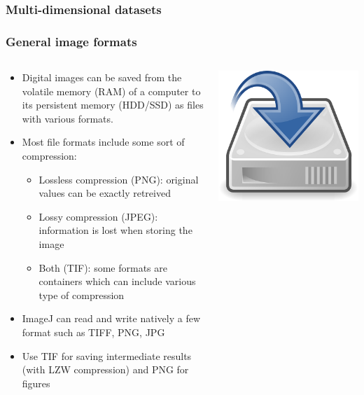 \documentclass[ignorenonframetext,aspectratio=169,10pt,xcolor=table]{beamer}
\begin{document}
\begin{frame} \frametitle{Multi-dimensional datasets}
\end{frame}

\begin{frame} \frametitle{General image formats}
  \begin{columns}
    \begin{column}{0.75\textwidth}
      \begin{itemize}
      \item Digital images can be saved from the volatile memory (RAM)
        of a computer to its persistent memory (HDD/SSD) as files with various
        formats.
      \item Most file formats include some sort of compression:
        \begin{itemize}
        \item Lossless compression (PNG): original values can be
          exactly retreived
        \item Lossy compression (JPEG): information is lost when
          storing the image
        \item Both (TIF): some formats are containers which can
          include various type of compression
        \end{itemize}
      \item ImageJ can read and write natively a few format such as
        TIFF, PNG, JPG
      \item Use TIF for saving intermediate results (with LZW
        compression) and PNG for figures
      \end{itemize}
    \end{column}
    \begin{column}{0.25\textwidth}
      \includegraphics[width=\textwidth]{drive}
    \end{column}
  \end{columns}
\end{frame}
\end{document}
